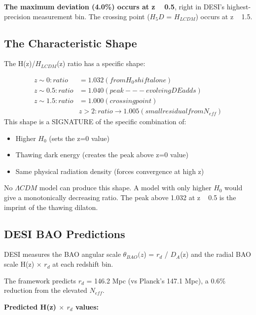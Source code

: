 \documentclass[aps,prd,preprint,superscriptaddress,longbibliography]{revtex4-2}
\begin{document}
\textbf{The maximum deviation (4.0\%) occurs at z ~ 0.5}, right in DESI's highest-precision measurement bin. The crossing point ($H_5D$ = $H_{LCDM}$) occurs at z ~ 1.5.



\subsection{The Characteristic Shape}

The H(z)/$H_{LCDM}$(z) ratio has a specific shape:


\begin{align}
    z \sim  0: ratio &= 1.032 (from H_{0} shift alone) \\
    z \sim  0.5: ratio &= 1.040 (peak --- evolving DE adds) \\
    z \sim  1.5: ratio &= 1.000 (crossing point) \\
    & z > 2: ratio \to 1.005 (small residual from N_{eff})
\end{align}
This shape is a SIGNATURE of the specific combination of:

\begin{itemize}
  \item Higher $H_{0}$ (sets the z=0 value)
  \item Thawing dark energy (creates the peak above z=0 value)
  \item Same physical radiation density (forces convergence at high z)
\end{itemize}

No $\Lambda CDM$ model can produce this shape. A model with only higher $H_{0}$ would give a monotonically decreasing ratio. The peak above 1.032 at z ~ 0.5 is the imprint of the thawing dilaton.



\subsection{DESI BAO Predictions}

DESI measures the BAO angular scale $\theta_{BAO}(z$) = $r_d$ / $D_A$(z) and the radial BAO scale H(z) $\times$ $r_d$ at each redshift bin.

The framework predicts $r_d$ = 146.2 Mpc (vs Planck's 147.1 Mpc), a 0.6\% reduction from the elevated $N_{eff}$.

\textbf{Predicted H(z) $\times$ $r_d$ values:}
\end{document}
